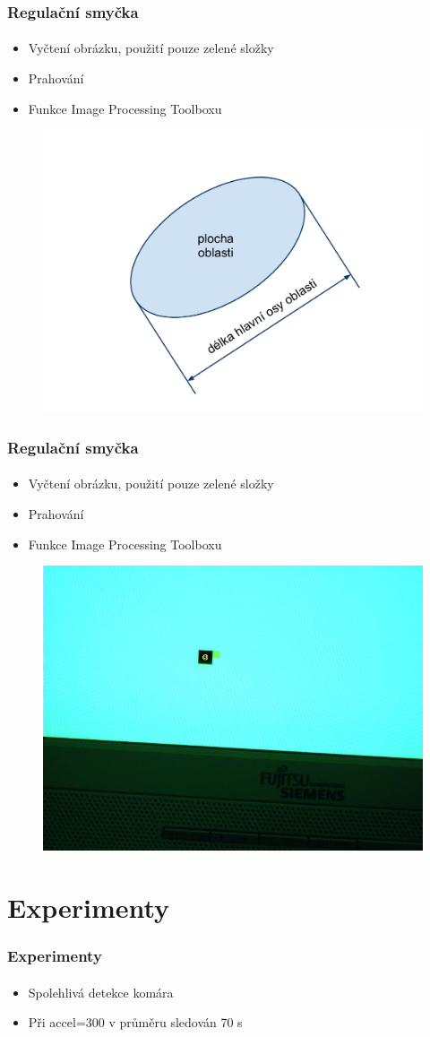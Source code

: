 \documentclass{beamer}
\begin{document}
\begin{frame}
\frametitle{Regulační smyčka}
 \framesubtitle{}
  \begin{itemize}
  \item Vyčtení obrázku, použití pouze zelené složky
  \item Prahování 
  \item Funkce Image Processing Toolboxu
 \end{itemize}
  \begin{figure}[!htb]
	\includegraphics[width=0.49\columnwidth]{pics/delka_hlavni_osy_a_plocha_oblasti}
  \end{figure}
\end{frame}

\begin{frame}
\frametitle{Regulační smyčka}
 \framesubtitle{}
  \begin{itemize}
  \item Vyčtení obrázku, použití pouze zelené složky
  \item Prahování 
  \item Funkce Image Processing Toolboxu
 \end{itemize}
  \begin{figure}[!htb]
	\includegraphics[width=0.49\columnwidth]{pics/zpracovani_obrazu-3}
  \end{figure}
\end{frame}

\section{Experimenty}
\begin{frame}
\frametitle{Experimenty}
 \framesubtitle{}
  \begin{itemize}
   \item Spolehlivá detekce komára
   \item Při accel=300 v průměru sledován 70 s
    
  \end{itemize}

\end{frame}
    
\end{document}
